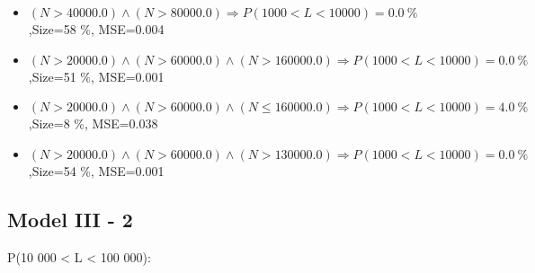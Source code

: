 \documentclass[numbered]{CSL}
\begin{document}
\begin{itemize}
\item $(N > 40000.0) \land (N > 80000.0) \Rightarrow P(1 000 < L < 10 000) = 0.0~\%$,\hfill Size=58 \%, MSE=0.004
\item $(N > 20000.0) \land (N > 60000.0) \land (N > 160000.0) \Rightarrow P(1 000 < L < 10 000) = 0.0~\%$,\hfill Size=51 \%, MSE=0.001
\item $(N > 20000.0) \land (N > 60000.0) \land (N \leq 160000.0) \Rightarrow P(1 000 < L < 10 000) = 4.0~\%$,\hfill Size=8 \%, MSE=0.038
\item $(N > 20000.0) \land (N > 60000.0) \land (N > 130000.0) \Rightarrow P(1 000 < L < 10 000) = 0.0~\%$,\hfill Size=54 \%, MSE=0.001
\end{itemize}

\subsection{Model III - 2}
P(10 000 < L < 100 000):
\end{document}
